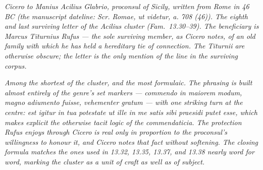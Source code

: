 
\textit{Cicero to Manius Acilius Glabrio, proconsul of
Sicily, written from Rome in 46 BC (the manuscript
dateline: \textit{Scr. Romae, ut videtur, a. 708 (46)}).
The eighth and last surviving letter of the Acilius
cluster (Fam.\ 13.30--39). The beneficiary is Marcus
Titurnius Rufus --- the sole surviving member, as Cicero
notes, of an old family with which he has held a
hereditary tie of connection. The Titurnii are
otherwise obscure; the letter is the only mention of
the line in the surviving corpus.}

\textit{Among the shortest of the cluster, and the most
formulaic. The phrasing is built almost entirely of the
genre's set markers --- \textit{commendo in maiorem
modum}, \textit{magno adiumento fuisse},
\textit{vehementer gratum} --- with one striking turn at
the centre: \textit{est igitur in tua potestate ut ille
in me satis sibi praesidi putet esse}, which makes
explicit the otherwise tacit logic of the
\textit{commendaticia}. The protection Rufus enjoys
through Cicero is real only in proportion to the
proconsul's willingness to honour it, and Cicero notes
that fact without softening. The closing formula
matches the ones used in 13.32, 13.35, 13.37, and 13.38
nearly word for word, marking the cluster as a unit of
craft as well as of subject.}
